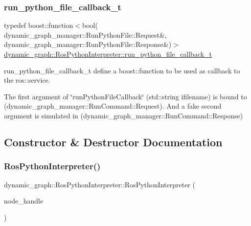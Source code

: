 \subsubsection{\texorpdfstring{run\+\_\+python\+\_\+file\+\_\+callback\+\_\+t}{run\_python\_file\_callback\_t}}
{\footnotesize\ttfamily typedef boost\+::function$<$bool( dynamic\+\_\+graph\+\_\+manager\+::\+Run\+Python\+File\+::\+Request\&, dynamic\+\_\+graph\+\_\+manager\+::\+Run\+Python\+File\+::\+Response\&)$>$ \hyperlink{classdynamic__graph_1_1RosPythonInterpreter_a7beecaa90bafc03798fd907da9690654}{dynamic\+\_\+graph\+::\+Ros\+Python\+Interpreter\+::run\+\_\+python\+\_\+file\+\_\+callback\+\_\+t}}



run\+\_\+python\+\_\+file\+\_\+callback\+\_\+t define a boost\+::function to be used as callback to the ros\+::service. 

The first argument of \char`\"{}run\+Python\+File\+Callback\char`\"{} (std\+::string ifilename) is bound to (dynamic\+\_\+graph\+\_\+manager\+::\+Run\+Command\+::\+Request). And a fake second argument is simulated in (dynamic\+\_\+graph\+\_\+manager\+::\+Run\+Command\+::\+Response) 

\subsection{Constructor \& Destructor Documentation}
\mbox{\label{classdynamic__graph_1_1RosPythonInterpreter_a082493a5a7edd758b65a34fc9e617df5}} 
\subsubsection{\texorpdfstring{Ros\+Python\+Interpreter()}{RosPythonInterpreter()}}
{\footnotesize\ttfamily dynamic\+\_\+graph\+::\+Ros\+Python\+Interpreter\+::\+Ros\+Python\+Interpreter (\begin{DoxyParamCaption}\item[{ros\+::\+Node\+Handle \&}]{node\+\_\+handle }\end{DoxyParamCaption})\hspace{0.3cm}{\ttfamily [explicit]}}



